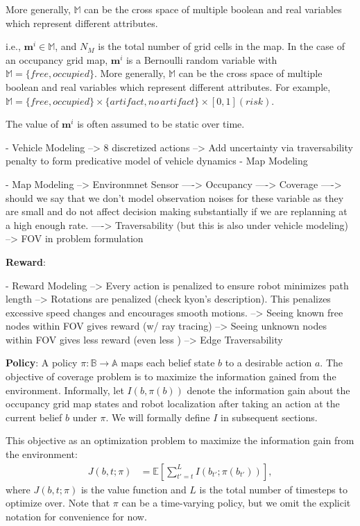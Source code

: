 \documentclass{article}
\newcommand{\ph}[1]{{\textbf{#1}:}} %
\begin{document}
More generally, $\mathbb{M}$ can be the cross space of multiple boolean and real variables which represent different attributes.


i.e., $\mathbf{m}^i \in \mathbb{M}$, and
$N_M$ is the total number of grid cells in the map.
In the case of an occupancy grid map, $\mathbf{m}^i$ is a Bernoulli random variable with $\mathbb{M} = \{free, occupied\}$.  More generally, $\mathbb{M}$ can be the cross space of multiple boolean and real variables which represent different attributes.  For example, $\mathbb{M} = \{free, occupied\}\times\{artifact, no\, artifact\}\times [0,1] (risk)$.

The value of $\mathbf{m}^i$ is often assumed to be static over time.


- Vehicle Modeling
--> 8 discretized actions
--> Add uncertainty via traversability penalty to form predicative model of vehicle dynamics
- Map Modeling

- Map Modeling
--> Environmnet Sensor
----> Occupancy
----> Coverage
----> should we say that we don't model observation noises for these variable as they are small and do not affect decision making substantially if we are replanning at a high enough rate.
----> Traversability (but this is also under vehicle modeling)
--> FOV in problem formulation



\ph{Reward}

- Reward Modeling
--> Every action is penalized to ensure robot minimizes path length
--> Rotations are penalized (check kyon's description). This penalizes excessive speed changes and encourages smooth motions.
--> Seeing known free nodes within FOV gives reward (w/ ray tracing)
--> Seeing unknown nodes within FOV gives less reward (even less )
--> Edge Traversability

\ph{Policy} A policy $\pi : \mathbb{B} \rightarrow \mathbb{A}$ maps each belief state $b$ to a desirable action $a$. The objective of coverage problem is to maximize the information gained from the environment. Informally, let $I(b, \pi(b))$ denote the information gain about the occupancy grid map states and robot localization after taking an action at the current belief $b$ under $\pi$.  We will formally define $I$ in subsequent sections.

This objective as an optimization problem to maximize the information gain from the environment:
\begin{align}
  J(b,t;\pi) &= \mathbb{E} \left[ \sum_{t'=t}^{L} I(b_{t'}; \pi(b_{t'})) \right], \label{eq:artifactopt_cost}
\end{align}
where $J(b,t;\pi)$ is the value function and $L$ is the total number of timesteps to optimize over.  Note that $\pi$ can be a time-varying policy, but we omit the explicit notation for convenience for now.
\end{document}
